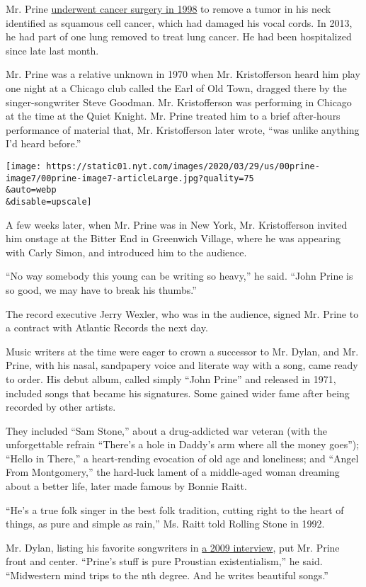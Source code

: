 Mr. Prine
\href{https://oralcancerfoundation.org/people/arts-entertainment/john-prine/}{underwent
cancer surgery in 1998} to remove a tumor in his neck identified as
squamous cell cancer, which had damaged his vocal cords. In 2013, he had
part of one lung removed to treat lung cancer. He had been hospitalized
since late last month.

Mr. Prine was a relative unknown in 1970 when Mr. Kristofferson heard
him play one night at a Chicago club called the Earl of Old Town,
dragged there by the singer-songwriter Steve Goodman. Mr. Kristofferson
was performing in Chicago at the time at the Quiet Knight. Mr. Prine
treated him to a brief after-hours performance of material that, Mr.
Kristofferson later wrote, ``was unlike anything I'd heard before.''

\texttt{[image: https://static01.nyt.com/images/2020/03/29/us/00prine-image7/00prine-image7-articleLarge.jpg?quality=75\\\&auto=webp\\\&disable=upscale]}

A few weeks later, when Mr. Prine was in New York, Mr. Kristofferson
invited him onstage at the Bitter End in Greenwich Village, where he was
appearing with Carly Simon, and introduced him to the audience.

``No way somebody this young can be writing so heavy,'' he said. ``John
Prine is so good, we may have to break his thumbs.''

The record executive Jerry Wexler, who was in the audience, signed Mr.
Prine to a contract with Atlantic Records the next day.

Music writers at the time were eager to crown a successor to Mr. Dylan,
and Mr. Prine, with his nasal, sandpapery voice and literate way with a
song, came ready to order. His debut album, called simply ``John Prine''
and released in 1971, included songs that became his signatures. Some
gained wider fame after being recorded by other artists.

They included ``Sam Stone,'' about a drug-addicted war veteran (with the
unforgettable refrain ``There's a hole in Daddy's arm where all the
money goes''); ``Hello in There,'' a heart-rending evocation of old age
and loneliness; and ``Angel From Montgomery,'' the hard-luck lament of a
middle-aged woman dreaming about a better life, later made famous by
Bonnie Raitt.

``He's a true folk singer in the best folk tradition, cutting right to
the heart of things, as pure and simple as rain,'' Ms. Raitt told
Rolling Stone in 1992.

Mr. Dylan, listing his favorite songwriters in
\href{https://www.huffpost.com/entry/bob-dylan-exclusive-inter_n_187216}{a
2009 interview}, put Mr. Prine front and center. ``Prine's stuff is pure
Proustian existentialism,'' he said. ``Midwestern mind trips to the nth
degree. And he writes beautiful songs.''

